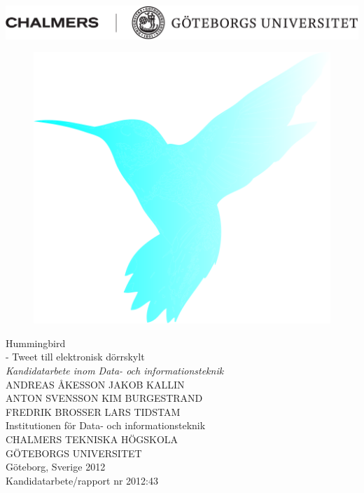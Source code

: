 \documentclass[a4paper,11pt]{article}
\begin{document}
\centerline{\includegraphics[scale=0.75, angle=0]{ChaGUsvartHD.png}}
\vspace{1.7cm}
\begin{figure}[H]
\begin{center}
\includegraphics[scale=0.22, angle=0]{titleIcon.png}
\end{center}
\label{fig:title_icon}
\end{figure}


\begin{flushleft}
\null
\vfill
{\huge Hummingbird} \\
	{\LARGE- Tweet till elektronisk dörrskylt}\\ [0.1cm]

\emph{\large{Kandidatarbete inom Data- och informationsteknik}} \\ [0.8cm]

{\Large ANDREAS ÅKESSON} \hspace{1cm} {\Large JAKOB KALLIN} \\ [0.1cm]
{\Large ANTON SVENSSON} \hspace{1.35cm} {\Large KIM BURGESTRAND} \\ [0.1cm]
{\Large FREDRIK BROSSER} \hspace{1.2cm} {\Large LARS TIDSTAM} \\ [0.9cm]


{\large Institutionen för Data- och informationsteknik} \\ [.3cm]
   {\large CHALMERS TEKNISKA HÖGSKOLA} \\
   {\large GÖTEBORGS UNIVERSITET} \\
  {\large Göteborg, Sverige 2012} \\
   {\large Kandidatarbete/rapport nr 2012:43} \\

\end{flushleft}	
\thispagestyle{empty}
\pagebreak
\end{document}
